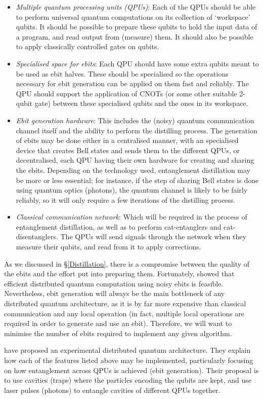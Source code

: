 \begin{itemize}
  \item \textit{Multiple quantum processing units (QPUs)}: Each of the QPUs should be able to perform universal quantum computations on its collection of `workspace' qubits. It should be possible to prepare these qubits to hold the input data of a program, and read output from (measure) them. It should also be possible to apply classically controlled gates on qubits.

  \item \textit{Specialised space for ebits}: Each QPU should have some extra qubits meant to be used as ebit halves. These should be specialised so the operations necessary for ebit generation can be applied on them fast and reliably. The QPU should support the application of CNOTs (or some other suitable 2-qubit gate) between these specialised qubits and the ones in its workspace.
  
  \item \textit{Ebit generation hardware}: This includes the (noisy) quantum communication channel itself and the ability to perform the distilling process. The generation of ebits may be done either in a centralised manner, with an specialised device that creates Bell states and sends them to the different QPUs, or decentralised, each QPU having their own hardware for creating and sharing the ebits. Depending on the technology used, entanglement distillation may be more or less essential; for instance, if the step of sharing Bell states is done using quantum optics (photons), the quantum channel is likely to be fairly reliably, so it will only require a few iterations of the distilling process.
  
  \item \textit{Classical communication network}: Which will be required in the process of entanglement distillation, as well as to perform cat-entanglers and cat-disentanglers. The QPUs will send signals through the network when they measure their qubits, and read from it to apply corrections. 
\end{itemize}

As we discussed in \S\ref{Distillation}, there is a compromise between the quality of the ebits and the effort put into preparing them. Fortunately, \citet{NoisyChannels} showed that efficient distributed quantum computation using noisy ebits is feasible. Nevertheless, ebit generation will always be the main bottleneck of any distributed quantum architecture, as it is by far more expensive than classical communication and any local operation (in fact, multiple local operations are required in order to generate and use an ebit). Therefore, we will want to minimise the number of ebits required to implement any given algorithm.

\citet{DistributedQCHW} have proposed an experimental distributed quantum architecture. They explain how each of the features listed above may be implemented, particularly focusing on how entanglement across QPUs is achieved (ebit generation). Their proposal is to use cavities (traps) where the particles encoding the qubits are kept, and use laser pulses (photons) to entangle cavities of different QPUs together.